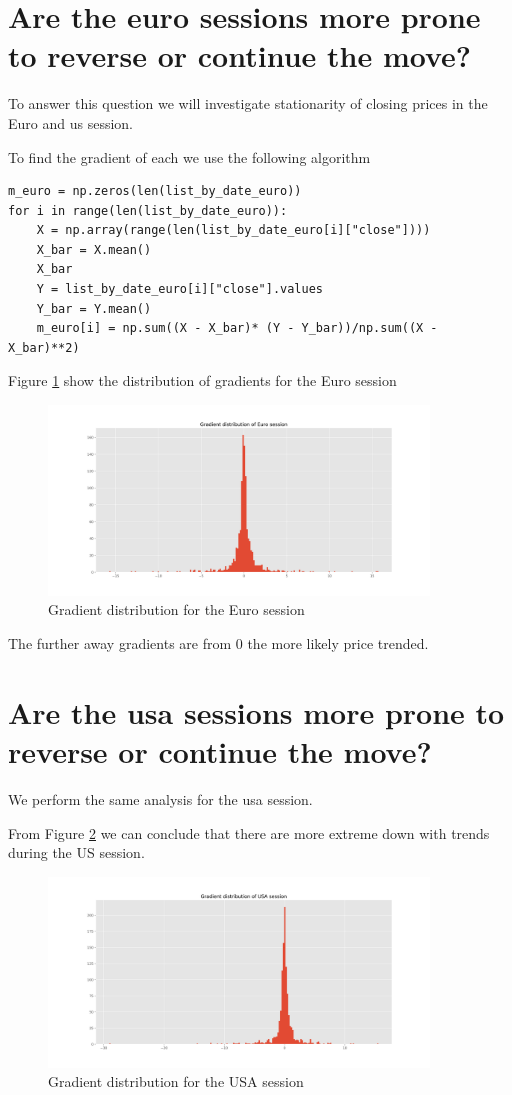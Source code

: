 \section{ Are the euro sessions more prone to reverse or continue the move?}
To answer this question we will investigate stationarity of closing prices in the Euro and us session.

To find the gradient of each we use the following algorithm

\begin{verbatim}
m_euro = np.zeros(len(list_by_date_euro))
for i in range(len(list_by_date_euro)):
    X = np.array(range(len(list_by_date_euro[i]["close"])))
    X_bar = X.mean()
    X_bar
    Y = list_by_date_euro[i]["close"].values
    Y_bar = Y.mean()
    m_euro[i] = np.sum((X - X_bar)* (Y - Y_bar))/np.sum((X - X_bar)**2)
\end{verbatim}

Figure \ref{fig:grad_euro} show the distribution of gradients for the Euro session 

\begin{figure}[H]
\center
\includegraphics[width=0.9\textwidth]{fig/grad_euro.png}
\caption{Gradient distribution for the Euro session}
\label{fig:grad_euro}
\end{figure}
The further away gradients are from 0 the more likely price trended.
\section{ Are the usa sessions more prone to reverse or continue the move?}
We perform the same analysis for the usa session.

From Figure \ref{fig:grad_usa} we can conclude that there are more extreme down with trends during the US session.
\begin{figure}[H]
\center
\includegraphics[width=0.9\textwidth]{fig/grad_usa.png}
\caption{Gradient distribution for the USA session}
\label{fig:grad_usa}
\end{figure}

